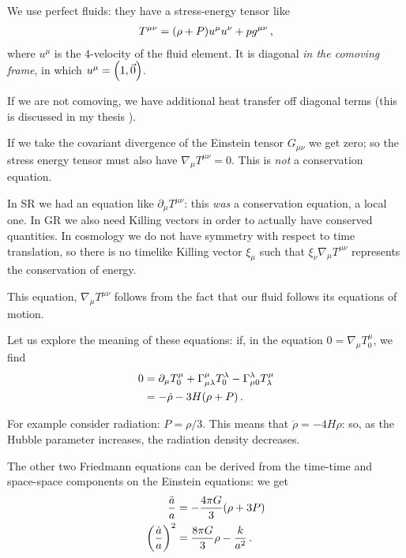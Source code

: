\documentclass[main.tex]{subfiles}
\begin{document}

We use perfect fluids: they have a stress-energy tensor like 
%
\begin{align}
T^{\mu \nu } =  \qty(\rho + P) u^{\mu } u^{\nu } + p g^{\mu \nu }
\,,
\end{align}
%
where \(u^{\mu }\) is the 4-velocity of the fluid element. 
It is diagonal \emph{in the comoving frame}, in which \(u^{\mu } = \qty(1, \vec{0})\).

If we are not comoving, we have additional heat transfer off diagonal terms (this is discussed in my thesis \cite[section 4.2]{tissinoRelativisticNonidealFlows2019}). 

If we take the covariant divergence of the Einstein tensor \(G_{\mu \nu }\) we get zero; so the stress energy tensor must also have \(\nabla_{\mu} T^{\mu \nu }=0\). 
This is \emph{not} a conservation equation. 

In SR we had an equation like \(\partial_{\mu}  T^{\mu \nu }\): this \emph{was} a conservation equation, a local one. 
In GR we also need Killing vectors in order to actually have conserved quantities. In cosmology we do not have symmetry with respect to time translation, so there is no timelike Killing vector \(\xi_{\mu }\) such that \(\xi_{\nu } \nabla_{\mu } T^{\mu \nu }\) represents the conservation of energy.

This equation, \(\nabla_{\mu } T^{\mu \nu }\) follows from the fact that our fluid follows its equations of motion. 

Let us explore the meaning of these equations: if, in the equation \(0 = \nabla_{\mu } T^{\mu}_{0}\),  we find 
%
\begin{subequations}
\begin{align}
0 &= \partial_{\mu } T^{\mu }_{0} + \Gamma^{\mu }_{\mu \lambda } T^{\lambda }_{0} - \Gamma^{\lambda }_{\mu 0} T^{\mu }_{\lambda }  \\
&= - \dot{\rho}- 3 H \qty(\rho + P) 
\,.
\end{align}
\end{subequations}

For example consider radiation: \(P = \rho /3\). This means that \(\dot{\rho}= - 4 H \rho  \): so, as the Hubble parameter increases, the radiation density decreases.

The other two Friedmann equations can be derived from the time-time and space-space components on the Einstein equations: we get 
%
\begin{subequations}
\begin{align}
\frac{\ddot{a}}{a} &= - \frac{4 \pi G}{ 3} \qty(\rho + 3 P)  \\
\qty(\frac{\dot{a}}{a})^2 &= \frac{8 \pi G}{3} \rho - \frac{k}{a^2}
\,.
\end{align}
\end{subequations}
\end{document}
